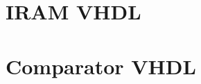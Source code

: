 \chapter{IRAM VHDL}
\label{appendix1}
	\scriptsize
	
	
\chapter{Comparator VHDL}
\label{appendix}
	\scriptsize
	
	
	
